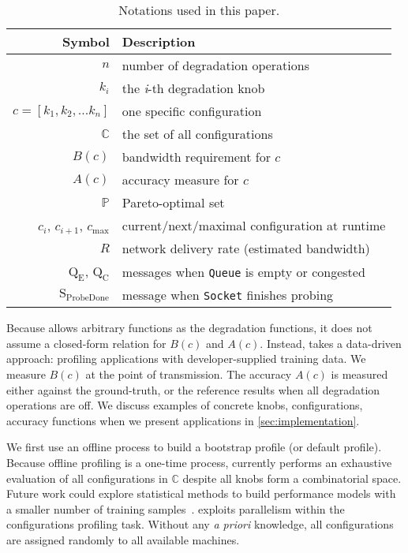 \begin{table}
  \footnotesize
  \centering
  \begin{tabular}{r l}
    \toprule
    \textbf{Symbol} & \textbf{Description} \\
    \midrule
    $n$ & number of degradation operations \\
    $k_i$ & the \textit{i}-th degradation knob \\
    $c = [k_{1}, k_{2}, ... k_{n}]$ & one specific configuration \\
    $\mathbb{C}$ & the set of all configurations \\
    \midrule
    $B(c)$ & bandwidth requirement for $c$ \\
    $A(c)$ & accuracy measure for $c$ \\
    $\mathbb{P}$ & Pareto-optimal set \\
    \midrule
    $c_i$, $c_{i+1}$, $c_{\max}$ & current/next/maximal configuration at runtime \\
    $R$ & network delivery rate (estimated bandwidth) \\
    $\text{Q}_\text{E}$, $\text{Q}_\text{C}$ & messages when \texttt{Queue} is empty or congested \\
    $\text{S}_\text{ProbeDone}$ & message when \texttt{Socket} finishes probing \\
    \bottomrule
  \end{tabular}
  \caption{Notations used in this paper.}
  \label{tab:notations}
\end{table}

Because \sysname{} allows arbitrary functions as the degradation functions, it
does not assume a closed-form relation for $B(c)$ and $A(c)$. Instead,
\sysname{} takes a data-driven approach: profiling applications with
developer-supplied training data.  We measure $B(c)$ at the point of
transmission. The accuracy $A(c)$ is measured either against the ground-truth,
or the reference results when all degradation operations are off.  We discuss
examples of concrete knobs, configurations, accuracy functions when we present
applications in \autoref{sec:implementation}.

 We first use an offline process to build a bootstrap
profile (or default profile). Because offline profiling is a one-time process,
\sysname{} currently performs an exhaustive evaluation of all configurations in
$\mathbb{C}$ despite all knobs form a combinatorial space. Future work could
explore statistical methods to build performance models with a smaller number of
training samples~\cite{venkataraman2016ernest,
  alipourfard2017cherrypick}. \sysname{} exploits parallelism within the
configurations profiling task. Without any \textit{a priori} knowledge, all
configurations are assigned randomly to all available machines.


